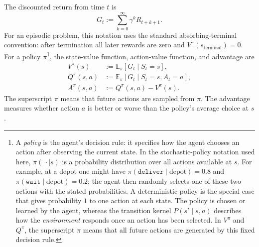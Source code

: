 \documentclass[11pt,a4paper]{article}
\theoremstyle{definition}
\begin{document}
\begin{definition}\label{def:return-value}
The discounted return from time $t$ is
\[
G_t:=\sum_{k=0}^{\infty}\gamma^kR_{t+k+1}.
\]
For an episodic problem, this notation uses the standard absorbing-terminal convention:
after termination all later rewards are zero and $V^\pi(s_{\mathrm{terminal}})=0$.
For a policy $\pi$\footnote{A \emph{policy} is the agent's decision rule: it specifies how
the agent chooses an action after observing the current state. In the stochastic-policy
notation used here, $\pi(\,\cdot\mid s)$ is a probability distribution over all actions
available at $s$. For example, at a depot one might have
$\pi(\texttt{deliver}\mid\text{depot})=0.8$ and
$\pi(\texttt{wait}\mid\text{depot})=0.2$; the agent then randomly selects one of these two
actions with the stated probabilities. A deterministic policy is the special case that gives
probability $1$ to one action at each state. The policy is chosen or learned by the agent,
whereas the transition kernel $P(s'\mid s,a)$ describes how the \emph{environment} responds
once an action has been selected. In $V^\pi$ and $Q^\pi$, the superscript $\pi$ means that
all future actions are generated by this fixed decision rule.}, the state-value function,
action-value function, and advantage are
\[
\begin{aligned}
V^\pi(s)&:=\mathbb{E}_\pi[G_t\mid S_t=s],\\
Q^\pi(s,a)&:=\mathbb{E}_\pi[G_t\mid S_t=s,A_t=a],\\
A^\pi(s,a)&:=Q^\pi(s,a)-V^\pi(s).
\end{aligned}
\]
The superscript $\pi$ means that future actions are sampled from $\pi$. The advantage
measures whether action $a$ is better or worse than the policy's average choice at $s$.
\end{definition}
\end{document}
